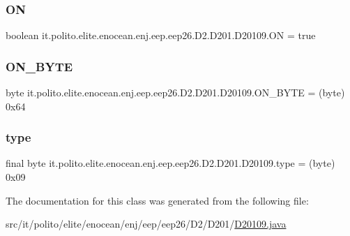 \subsubsection{\texorpdfstring{ON}{ON}}
{\footnotesize\ttfamily boolean it.\+polito.\+elite.\+enocean.\+enj.\+eep.\+eep26.\+D2.\+D201.\+D20109.\+ON = true\hspace{0.3cm}{\ttfamily [static]}}

\hypertarget{classit_1_1polito_1_1elite_1_1enocean_1_1enj_1_1eep_1_1eep26_1_1_d2_1_1_d201_1_1_d20109_ae9658ff35af9b80eec61d548a75d49a3}{}\label{classit_1_1polito_1_1elite_1_1enocean_1_1enj_1_1eep_1_1eep26_1_1_d2_1_1_d201_1_1_d20109_ae9658ff35af9b80eec61d548a75d49a3} 
\subsubsection{\texorpdfstring{O\+N\+\_\+\+B\+Y\+TE}{ON\_BYTE}}
{\footnotesize\ttfamily byte it.\+polito.\+elite.\+enocean.\+enj.\+eep.\+eep26.\+D2.\+D201.\+D20109.\+O\+N\+\_\+\+B\+Y\+TE = (byte) 0x64\hspace{0.3cm}{\ttfamily [static]}}

\hypertarget{classit_1_1polito_1_1elite_1_1enocean_1_1enj_1_1eep_1_1eep26_1_1_d2_1_1_d201_1_1_d20109_a8c9e173baf621192b9b6cce4d08debed}{}\label{classit_1_1polito_1_1elite_1_1enocean_1_1enj_1_1eep_1_1eep26_1_1_d2_1_1_d201_1_1_d20109_a8c9e173baf621192b9b6cce4d08debed} 
\subsubsection{\texorpdfstring{type}{type}}
{\footnotesize\ttfamily final byte it.\+polito.\+elite.\+enocean.\+enj.\+eep.\+eep26.\+D2.\+D201.\+D20109.\+type = (byte) 0x09\hspace{0.3cm}{\ttfamily [static]}}



The documentation for this class was generated from the following file\+:\begin{DoxyCompactItemize}
\item 
src/it/polito/elite/enocean/enj/eep/eep26/\+D2/\+D201/\hyperlink{_d20109_8java}{D20109.\+java}\end{DoxyCompactItemize}
